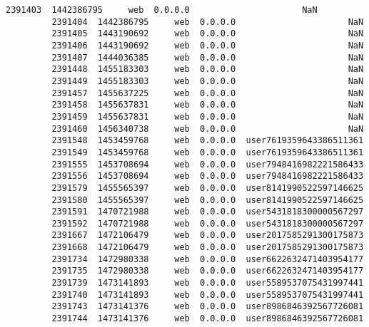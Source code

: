 \documentclass[11pt]{article}
\begin{document}
\begin{Verbatim}[commandchars=\\\{\}]
         2391403  1442386795     web  0.0.0.0                      NaN   
         2391404  1442386795     web  0.0.0.0                      NaN   
         2391405  1443190692     web  0.0.0.0                      NaN   
         2391406  1443190692     web  0.0.0.0                      NaN   
         2391407  1444036385     web  0.0.0.0                      NaN   
         2391448  1455183303     web  0.0.0.0                      NaN   
         2391449  1455183303     web  0.0.0.0                      NaN   
         2391457  1455637225     web  0.0.0.0                      NaN   
         2391458  1455637831     web  0.0.0.0                      NaN   
         2391459  1455637831     web  0.0.0.0                      NaN   
         2391460  1456340738     web  0.0.0.0                      NaN   
         2391548  1453459768     web  0.0.0.0  user7619359643386511361   
         2391549  1453459768     web  0.0.0.0  user7619359643386511361   
         2391555  1453708694     web  0.0.0.0  user7948416982221586433   
         2391556  1453708694     web  0.0.0.0  user7948416982221586433   
         2391579  1455565397     web  0.0.0.0  user8141990522597146625   
         2391580  1455565397     web  0.0.0.0  user8141990522597146625   
         2391591  1470721988     web  0.0.0.0  user5431818300000567297   
         2391592  1470721988     web  0.0.0.0  user5431818300000567297   
         2391667  1472106479     web  0.0.0.0  user2017585291300175873   
         2391668  1472106479     web  0.0.0.0  user2017585291300175873   
         2391734  1472980338     web  0.0.0.0  user6622632471403954177   
         2391735  1472980338     web  0.0.0.0  user6622632471403954177   
         2391739  1473141893     web  0.0.0.0  user5589537075431997441   
         2391740  1473141893     web  0.0.0.0  user5589537075431997441   
         2391743  1473141376     web  0.0.0.0  user8986846392567726081   
         2391744  1473141376     web  0.0.0.0  user8986846392567726081   
         

\end{Verbatim}
\end{document}
